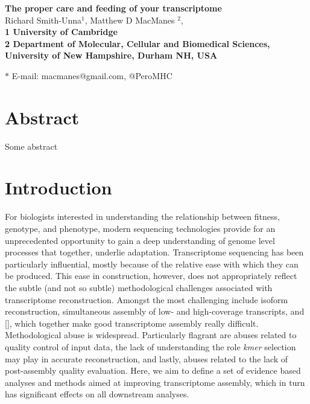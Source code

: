 \documentclass[11pt]{article}
\date{}
\begin{document}
\begin{flushleft}
{\Large
\textbf{The proper care and feeding of your transcriptome}
} \\

Richard Smith-Unna$^{1}$, 
Matthew D MacManes $^{2}$, 
\\


\bf{1} University of Cambridge \\
\bf{2} Department of Molecular, Cellular and Biomedical Sciences, University of New Hampshire, Durham NH, USA


$\ast$ E-mail: macmanes@gmail.com, @PeroMHC
\end{flushleft}

\linenumbers

\section*{Abstract}
Some abstract


\section*{Introduction}

For biologists interested in understanding the relationship between fitness, genotype, and phenotype, modern sequencing technologies provide for an unprecedented opportunity to gain a deep understanding of genome level processes that together, underlie adaptation. Transcriptome sequencing has been particularly influential, mostly because of the relative ease with which they can be produced. This ease in construction, however, does not appropriately reflect the subtle (and not so subtle) methodological challenges associated with transcriptome reconstruction. Amongst the most challenging include isoform reconstruction, simultaneous assembly of low- and high-coverage transcripts, and [], which together make good transcriptome assembly really difficult. \\
 
Methodological abuse is widespread. Particularly flagrant are abuses related to quality control of input data, the lack of understanding the role \textit{kmer} selection may play in accurate reconstruction, and lastly, abuses related to the lack of post-assembly quality evaluation. Here, we aim to define a set of evidence based analyses and methods aimed at improving transcriptome assembly, which in turn has significant effects on all downstream analyses. 
\end{document}
